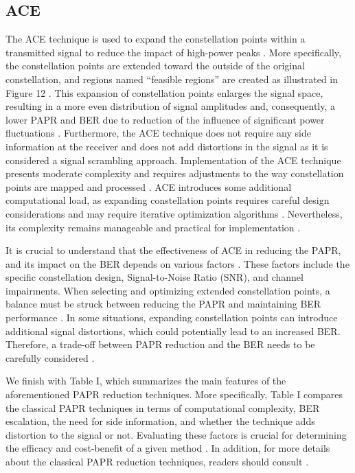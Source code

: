 \documentclass[conference]{IEEEtran}
\begin{document}
\subsection{ACE}
The ACE technique is used to expand the constellation points within a transmitted signal to reduce the impact of high-power peaks \cite{b124}. More specifically, the constellation points are extended toward the outside of the original constellation, and regions named ``feasible regions'' are created as illustrated in Figure 12 \cite{b123}. This expansion of constellation points enlarges the signal space, resulting in a more even distribution of signal amplitudes and, consequently, a lower PAPR and BER due to reduction of the influence of significant power fluctuations \cite{b125}. Furthermore, the ACE technique does not require any side information at the receiver and does not add distortions in the signal as it is considered a signal scrambling approach. Implementation of the ACE technique presents moderate complexity and requires adjustments to the way constellation points are mapped and processed \cite{b126, b127}. ACE introduces some additional computational load, as expanding constellation points requires careful design considerations and may require iterative optimization algorithms \cite{b128}. Nevertheless, its complexity remains manageable and practical for implementation \cite{b129}.

It is crucial to understand that the effectiveness of ACE in reducing the PAPR, and its impact on the BER depends on various factors \cite{b130}. These factors include the specific constellation design, Signal-to-Noise Ratio (SNR), and channel impairments. When selecting and optimizing extended constellation points, a balance must be struck between reducing the PAPR and maintaining BER performance \cite{b131, b132}. In some situations, expanding constellation points can introduce additional signal distortions, which could potentially lead to an increased BER. Therefore, a trade-off between PAPR reduction and the BER needs to be carefully considered \cite{b133}.

We finish with Table I, which summarizes the main features of the aforementioned PAPR reduction techniques. More specifically, Table I compares the classical PAPR techniques in terms of computational complexity, BER escalation, the need for side information, and whether the technique adds distortion to the signal or not. Evaluating these factors is crucial for determining the efficacy and cost-benefit of a given method \cite{b132}. In addition, for more details about the classical PAPR reduction techniques, readers should consult \cite{b50}.
\end{document}

